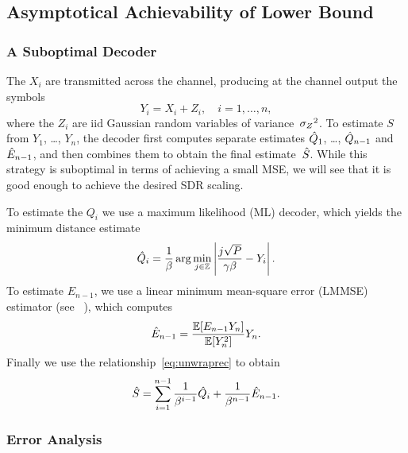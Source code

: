 \subsection{Asymptotical Achievability of Lower Bound}
\label{sec:achievable}

\subsubsection{A Suboptimal Decoder}

The $X_i$ are transmitted across the channel, producing at the channel output
the symbols
\begin{equation*}
  Y_i = X_i + Z_i, \quad i = 1, \dots, n,
\end{equation*}
where the $Z_i$ are iid Gaussian random variables of variance~${{\sigma_Z}^2}$. 
To estimate $S$ from  $Y_1$, \dots, $Y_n$, the decoder first
computes separate estimates $\hat{Q}_1$, \dots, $\hat{Q}_{n-1}$ and $\hat{E}_{n-1}$, and
then combines them to obtain the final estimate~${\hat{S}}$.  While this strategy is
suboptimal in terms of achieving a small MSE, we will see that it is good enough
to achieve the desired SDR scaling.

To estimate the $Q_i$ we use a maximum likelihood (ML) decoder, which yields the
minimum distance estimate
\begin{equation}
  \label{eq:mldecoder}
  \hat{Q}_i = \frac{1}{\beta} \arg \min_{j\in \mathbb{Z}} \left| \frac{j\sqrt{P}}
  {\gamma\beta} - Y_i \right|.
\end{equation}
To estimate $E_{n-1}$, we use a linear minimum mean-square error (LMMSE)
estimator (see \eg~\cite[Section~8.3]{Scharf1990}), which computes
\begin{equation}
  \label{eq:lmmse}
  \hat{E}_{n-1} = \frac{\mathbb{E}[E_{n-1} Y_n]}{\mathbb{E}[Y_n^2]} Y_n.
\end{equation}
Finally we use the relationship~\eqref{eq:unwraprec} to obtain
\begin{equation}
  \label{eq:unwrapestim}
  {\hat{S}} = \sum_{i=1}^{n-1} \frac{1}{\beta^{i-1}} \hat{Q}_i + \frac{1}{\beta^{n-1}}
  \hat{E}_{n-1}.
\end{equation}


\subsubsection{Error Analysis}

